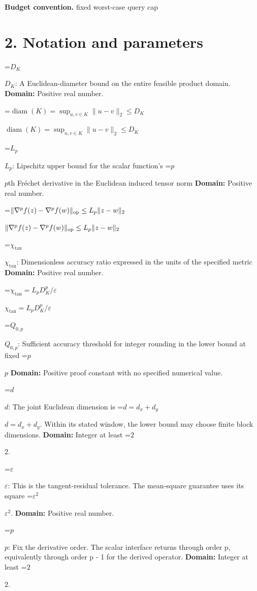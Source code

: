 \documentclass[10pt,a4paper]{article}
\newcommand{\AtlasMath}[1]{\par\begingroup\centering\setbox0=\hbox{$\displaystyle #1$}\ifdim\wd0>1.4\linewidth\typeout{ATLAS WIDE FORMULA: \the\wd0}\fi\ifdim\wd0>\linewidth\resizebox{\linewidth}{!}{\box0}\else\box0\fi\par\endgroup}
\newcommand{\AtlasInlineMath}[1]{\begingroup\setbox0=\hbox{$#1$}\ifdim\wd0>.4\linewidth\endgroup\AtlasMath{#1}\else\endgroup$#1$\fi}
\begin{document}
\textbf{Budget convention.} fixed worst-case query cap



\section{2. Notation and parameters}


\AtlasInlineMath{D_K}: A Euclidean-diameter bound on the entire feasible product domain. \textbf{Domain:} Positive real number.



\AtlasInlineMath{\operatorname{diam}(K)=\sup_{u,v\in K}\|u-v\|_2\le D_K}



\AtlasInlineMath{L_p}: Lipschitz upper bound for the scalar function's \AtlasInlineMath{p}th Fréchet derivative in the Euclidean induced tensor norm \textbf{Domain:} Positive real number.



\AtlasInlineMath{\|\nabla^p f(z)-\nabla^p f(w)\|_{\rm op}\le L_p\|z-w\|_2}



\AtlasInlineMath{\chi_{\mathrm{tan}}}: Dimensionless accuracy ratio expressed in the units of the specified metric \textbf{Domain:} Positive real number.



\AtlasInlineMath{\chi_{\mathrm{tan}}=L_pD_K^{p}/\varepsilon}



\AtlasInlineMath{Q_{0,p}}: Sufficient accuracy threshold for integer rounding in the lower bound at fixed \AtlasInlineMath{p} \textbf{Domain:} Positive proof constant with no specified numerical value.



\AtlasInlineMath{d}: The joint Euclidean dimension is \AtlasInlineMath{d=d_x+d_y}. Within its stated window, the lower bound may choose finite block dimensions. \textbf{Domain:} Integer at least \AtlasInlineMath{2}.



\AtlasInlineMath{\varepsilon}: This is the tangent-residual tolerance. The mean-square guarantee uses its square \AtlasInlineMath{\varepsilon^2}. \textbf{Domain:} Positive real number.



\AtlasInlineMath{p}: Fix the derivative order. The scalar interface returns through order p, equivalently through order p - 1 for the derived operator. \textbf{Domain:} Integer at least \AtlasInlineMath{2}.
\end{document}
